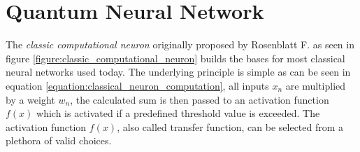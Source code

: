
\newpage

\section{Quantum Neural Network}

The \textit{classic computational neuron} originally proposed by Rosenblatt F.\cite{rosenblatt_perceptron_1958} as seen in figure \ref{figure:classic_computational_neuron} builds the bases for most classical neural networks used today. The underlying principle is simple as can be seen in equation \ref{equation:classical_neuron_computation}, all inputs $x_n$ are multiplied by a weight $w_n$, the calculated sum is then passed to an activation function $f(x)$ which is activated if a predefined threshold value is exceeded. The activation function $f(x)$, also called transfer function, can be selected from a plethora of valid choices\cite{szandala_review_2021}.

